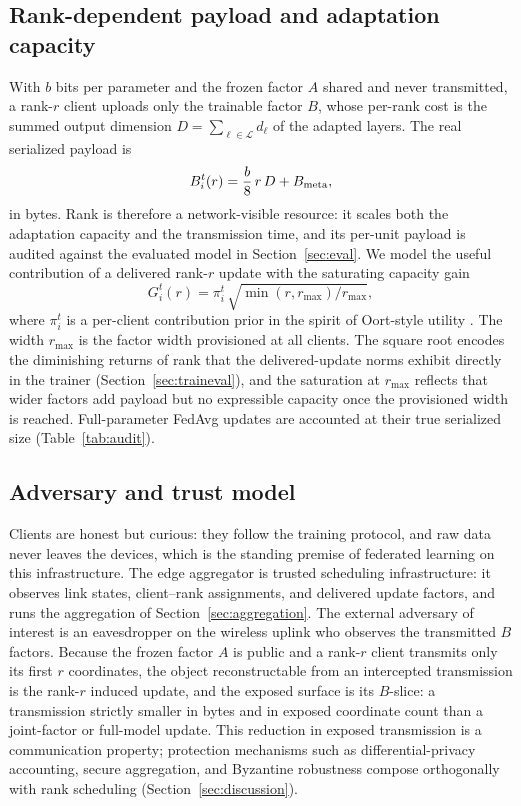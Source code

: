 \documentclass[a4paper,fleqn]{cas-dc}
\begin{document}
\subsection{Rank-dependent payload and adaptation capacity}
With $b$ bits per parameter and the frozen factor $A$ shared and never transmitted, a rank-$r$ client uploads only the trainable factor $B$, whose per-rank cost is the summed output dimension $D=\sum_{\ell\in\mathcal L}d_\ell$ of the adapted layers. The real serialized payload is
\begin{equation}
B_i^t(r)=\frac{b}{8}\,r\,D+B_{\rm meta},
\label{eq:size}
\end{equation}
in bytes. Rank is therefore a network-visible resource: it scales both the adaptation capacity and the transmission time, and its per-unit payload is audited against the evaluated model in Section~\ref{sec:eval}. We model the useful contribution of a delivered rank-$r$ update with the saturating capacity gain
\begin{equation}
G_i^t(r)=\pi_i^t\,\sqrt{\min(r,r_{\max})/r_{\max}},
\label{eq:cap}
\end{equation}
where $\pi_i^t$ is a per-client contribution prior in the spirit of Oort-style utility \cite{oort2021oort}. The width $r_{\max}$ is the factor width provisioned at all clients. The square root encodes the diminishing returns of rank that the delivered-update norms exhibit directly in the trainer (Section~\ref{sec:traineval}), and the saturation at $r_{\max}$ reflects that wider factors add payload but no expressible capacity once the provisioned width is reached. Full-parameter FedAvg updates are accounted at their true serialized size (Table~\ref{tab:audit}).

\subsection{Adversary and trust model}
Clients are honest but curious: they follow the training protocol, and raw data never leaves the devices, which is the standing premise of federated learning on this infrastructure. The edge aggregator is trusted scheduling infrastructure: it observes link states, client--rank assignments, and delivered update factors, and runs the aggregation of Section~\ref{sec:aggregation}. The external adversary of interest is an eavesdropper on the wireless uplink who observes the transmitted $B$ factors. Because the frozen factor $A$ is public and a rank-$r$ client transmits only its first $r$ coordinates, the object reconstructable from an intercepted transmission is the rank-$r$ induced update, and the exposed surface is its $B$-slice: a transmission strictly smaller in bytes and in exposed coordinate count than a joint-factor or full-model update. This reduction in exposed transmission is a communication property; protection mechanisms such as differential-privacy accounting, secure aggregation, and Byzantine robustness compose orthogonally with rank scheduling (Section~\ref{sec:discussion}).
\end{document}
